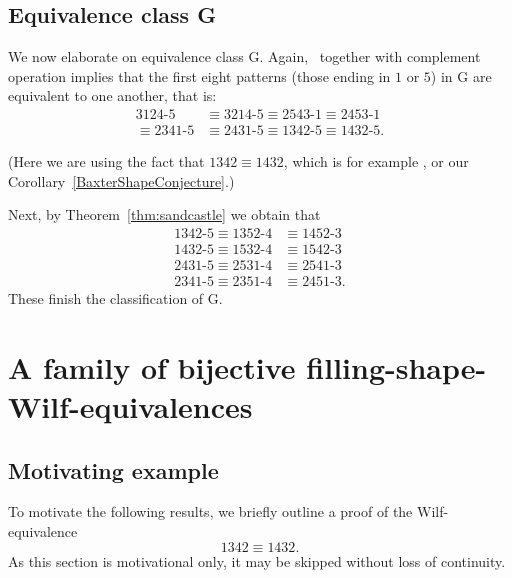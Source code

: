 \documentclass[11pt]{amsart}
\theoremstyle{definition}
\begin{document}
\subsection{Equivalence class G}
\label{sec:G}
We now elaborate on equivalence class G.
Again, {\cite{Elizalde2006,Kitaev2005}}\ together with complement operation implies that
the first eight patterns (those ending in $1$ or $5$)
in G are equivalent to one another, that is:
\begin{align*}
	3124{\text{-}}5 &\equiv 3214{\text{-}}5\equiv 2543{\text{-}}1\equiv 2453{\text{-}}1 \\
	\equiv 2341{\text{-}}5 &\equiv 2431{\text{-}}5\equiv 1342{\text{-}}5\equiv 1432{\text{-}}5.
\end{align*}

(Here we are using the fact that $1342 \equiv 1432$,
which is for example \cite{ElizaldeNoy2003},
or our Corollary~\ref{BaxterShapeConjecture}.)

Next, by Theorem~\ref{thm:sandcastle} we obtain that
\begin{align*}
	1342{\text{-}}5 \equiv 1352{\text{-}}4 &\equiv 1452{\text{-}}3 \tag{Ga} \\
	1432{\text{-}}5 \equiv 1532{\text{-}}4 &\equiv 1542{\text{-}}3 \tag{Gb} \\
	2431{\text{-}}5 \equiv 2531{\text{-}}4 &\equiv 2541{\text{-}}3 \tag{Gc} \\
	2341{\text{-}}5 \equiv 2351{\text{-}}4 &\equiv 2451{\text{-}}3. \tag{Gd}
\end{align*}
These finish the classification of G.

\section{A family of bijective filling-shape-Wilf-equivalences}

\subsection{Motivating example}
To motivate the following results,
we briefly outline a proof of the Wilf-equivalence
\[ 1342 \equiv 1432. \]
As this section is motivational only,
it may be skipped without loss of continuity.
\end{document}
